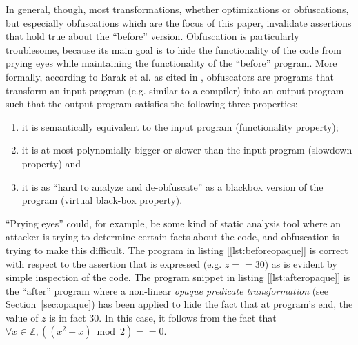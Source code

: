 \documentclass[compsoc,conference,a4paper,10pt,times]{IEEEtran}
\begin{document}
In general, though, most transformations, whether optimizations or obfuscations, but especially obfuscations which are the focus of this paper, invalidate assertions that hold true about the ``before'' version. Obfuscation is particularly troublesome, because its main goal is to hide the functionality of the code from prying eyes while maintaining the functionality of the ``before'' program. More formally, according to Barak et al. as cited in \cite{BanescuCGNP16}, obfuscators are programs that transform an input program (e.g. similar to a compiler) into an output program such that the output program satisfies the following three properties:
\begin{enumerate}
   \item it is semantically equivalent to the input program (functionality property); \label{itm:firstproperty}
   \item it is at most polynomially bigger or slower than the input program (slowdown property) and \label{itm:secondproperty}
   \item it is as ``hard to analyze and de-obfuscate'' as a blackbox version of the program (virtual black-box property). \label{itm:thirdproperty}
\end{enumerate}
``Prying eyes'' could, for example, be some kind of static analysis tool where an attacker is trying to determine certain facts about the code, and obfuscation is trying to make this difficult. The program in listing [\ref{lst:beforeopaque}] is correct with respect to the assertion that is expressed (e.g. $z == 30$) as is evident by simple inspection of the code. The program snippet in listing [\ref{lst:afteropaque}] is the ``after'' program where a non-linear \emph{opaque predicate transformation} (see Section~\ref{sec:opaque}) has been applied to hide the fact that at program's end, the value of $z$ is in fact 30. In this case, it follows from the fact that $\forall x \in \mathbb{Z}, ((x^2 + x)\bmod 2) == 0$. 
\end{document}
